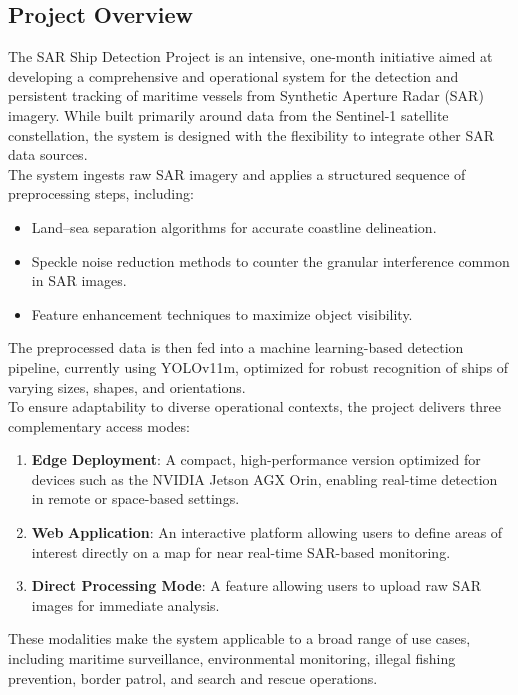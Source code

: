 \documentclass{article}
\begin{document}
	\subsection{Project Overview}
	The SAR Ship Detection Project is an intensive, one-month initiative aimed at developing a comprehensive and operational system for the detection and persistent tracking of maritime vessels from Synthetic Aperture Radar (SAR) imagery. While built primarily around data from the Sentinel-1 satellite constellation, the system is designed with the flexibility to integrate other SAR data sources.\\
	
	The system ingests raw SAR imagery and applies a structured sequence of preprocessing steps, including:
	\begin{itemize}
		\item Land–sea separation algorithms for accurate coastline delineation.
		\item Speckle noise reduction methods to counter the granular interference common in SAR images.
		\item Feature enhancement techniques to maximize object visibility.
	\end{itemize}
	The preprocessed data is then fed into a machine learning-based detection pipeline, currently using YOLOv11m, optimized for robust recognition of ships of varying sizes, shapes, and orientations.\\
	
	
	To ensure adaptability to diverse operational contexts, the project delivers three complementary access modes:
	\begin{enumerate}
		\item \textbf{Edge Deployment}: A compact, high-performance version optimized for devices such as the NVIDIA Jetson AGX Orin, enabling real-time detection in remote or space-based settings.
		\item \textbf{Web} \textbf{Application}: An interactive platform allowing users to define areas of interest directly on a map for near real-time SAR-based monitoring.
		\item \textbf{Direct Processing Mode}:  A feature allowing users to upload raw SAR images for immediate analysis.
	\end{enumerate}
	These modalities make the system applicable to a broad range of use cases, including maritime surveillance, environmental monitoring, illegal fishing prevention, border patrol, and search and rescue operations.\\
	
\end{document}
